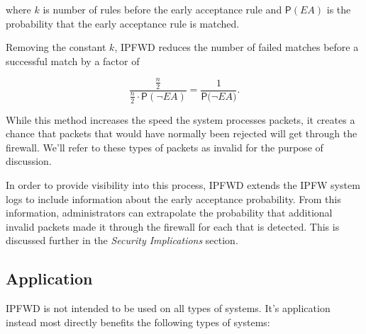\documentclass[journal]{IEEEtran}
\begin{document}
  where $k$ is number of rules before the early acceptance rule and
  $\mathsf{P}(\textit{EA})$ is the probability that the early acceptance rule
  is matched.

  Removing the constant $k$, IPFWD reduces the number of failed matches before
  a successful match by a factor of

  \[
  \frac
      {\frac{n}{2}}
      {\frac{n}{2} \cdot \mathsf{P}(\neg{\textit{EA}})} 
  = \frac{1}{\mathsf{P}(\neg{\textit{EA})}}.
  \]

  While this method increases the speed the system processes packets, it
  creates a chance that packets that would have normally been rejected will get
  through the firewall. We'll refer to these types of packets as invalid for
  the purpose of discussion.

  In order to provide visibility into this process, IPFWD extends the IPFW
  system logs to include information about the early acceptance probability.
  From this information, administrators can extrapolate the probability that
  additional invalid packets made it through the firewall for each that is
  detected. This is discussed further in the \textit{Security Implications}
  section.

  \subsection{Application}

    IPFWD is not intended to be used on all types of systems. It's application
    instead most directly benefits the following types of systems:
\end{document}
